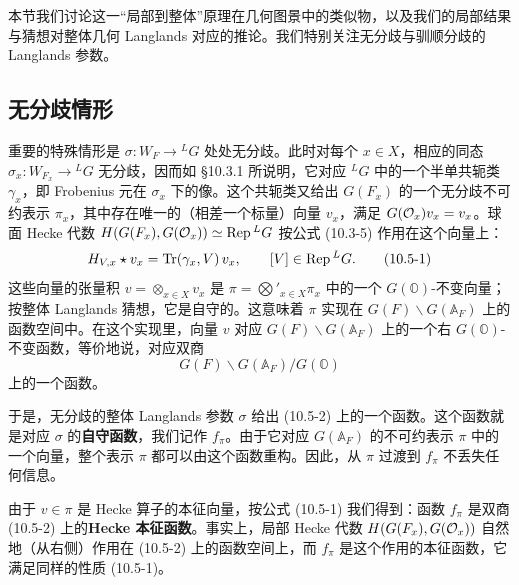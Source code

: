 本节我们讨论这一“局部到整体”原理在几何图景中的类似物，以及我们的局部结果与猜想对整体几何 Langlands 对应的推论。我们特别关注无分歧与驯顺分歧的 Langlands 参数。

\subsection{无分歧情形}

重要的特殊情形是 $\sigma:W_F\to{}^L G$ 处处无分歧。此时对每个 $x\in X$，相应的同态 $\sigma_x:W_{F_x}\to{}^L G$ 无分歧，因而如 §10.3.1 所说明，它对应 ${}^L G$ 中的一个半单共轭类 $\gamma_x$，即 Frobenius 元在 $\sigma_x$ 下的像。这个共轭类又给出 $G(F_x)$ 的一个无分歧不可约表示 $\pi_x$，其中存在唯一的（相差一个标量）向量 $v_x$，满足 $G(\mathcal{O}_x)v_x=v_x$。球面 Hecke 代数 $H(G(F_x),G(\mathcal{O}_x))\simeq\operatorname{Rep}{}^L G$ 按公式 (10.3-5) 作用在这个向量上：
\begin{equation}
    H_{V,x}\star v_x = \operatorname{Tr}(\gamma_x,V)\,v_x,
    \qquad [V]\in\operatorname{Rep}{}^L G.
    \tag{10.5-1}
\end{equation}
这些向量的张量积 $v=\otimes_{x\in X}v_x$ 是 $\pi=\bigotimes'_{x\in X}\pi_x$ 中的一个 $G(\mathbb{O})$-不变向量；按整体 Langlands 猜想，它是自守的。这意味着 $\pi$ 实现在 $G(F)\backslash G(\mathbb{A}_F)$ 上的函数空间中。在这个实现里，向量 $v$ 对应 $G(F)\backslash G(\mathbb{A}_F)$ 上的一个右 $G(\mathbb{O})$-不变函数，等价地说，对应双商
\begin{equation}
    G(F)\backslash G(\mathbb{A}_F)/G(\mathbb{O})
    \tag{10.5-2}
\end{equation}
上的一个函数。


于是，无分歧的整体 Langlands 参数 $\sigma$ 给出 (10.5-2) 上的一个函数。这个函数就是对应 $\sigma$ 的\textbf{自守函数}，我们记作 $f_\pi$。由于它对应 $G(\mathbb{A}_F)$ 的不可约表示 $\pi$ 中的一个向量，整个表示 $\pi$ 都可以由这个函数重构。因此，从 $\pi$ 过渡到 $f_\pi$ 不丢失任何信息。

由于 $v\in\pi$ 是 Hecke 算子的本征向量，按公式 (10.5-1) 我们得到：函数 $f_\pi$ 是双商 (10.5-2) 上的\textbf{Hecke 本征函数}。事实上，局部 Hecke 代数 $H(G(F_x),G(\mathcal{O}_x))$ 自然地（从右侧）作用在 (10.5-2) 上的函数空间上，而 $f_\pi$ 是这个作用的本征函数，它满足同样的性质 (10.5-1)。

